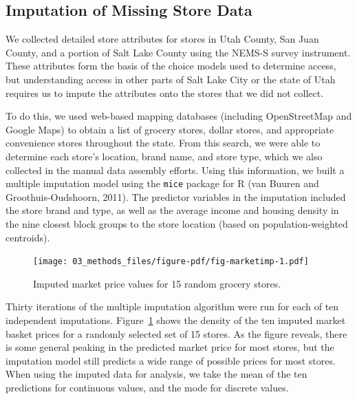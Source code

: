 \documentclass[
  letterpaper,
  DIV=11,
  numbers=noendperiod]{scrreport}
\begin{document}
\hypertarget{imputation-of-missing-store-data}{%
\subsection{Imputation of Missing Store
Data}\label{imputation-of-missing-store-data}}

We collected detailed store attributes for stores in Utah County, San
Juan County, and a portion of Salt Lake County using the NEMS-S survey
instrument. These attributes form the basis of the choice models used to
determine access, but understanding access in other parts of Salt Lake
City or the state of Utah requires us to impute the attributes onto the
stores that we did not collect.

To do this, we used web-based mapping databases (including OpenStreetMap
and Google Maps) to obtain a list of grocery stores, dollar stores, and
appropriate convenience stores throughout the state. From this search,
we were able to determine each store's location, brand name, and store
type, which we also collected in the manual data assembly efforts. Using
this information, we built a multiple imputation model using the
\texttt{mice} package for R (van Buuren and Groothuis-Oudshoorn, 2011).
The predictor variables in the imputation included the store brand and
type, as well as the average income and housing density in the nine
closest block groups to the store location (based on population-weighted
centroids).

\begin{figure}[t]

{\centering \texttt{[image: 03\_methods\_files/figure-pdf/fig-marketimp-1.pdf]}

}

\caption{\label{fig-marketimp}Imputed market price values for 15 random
grocery stores.}

\end{figure}

Thirty iterations of the multiple imputation algorithm were run for each
of ten independent imputations. Figure~\ref{fig-marketimp} shows the
density of the ten imputed market basket prices for a randomly selected
set of 15 stores. As the figure reveals, there is some general peaking
in the predicted market price for most stores, but the imputation model
still predicts a wide range of possible prices for most stores. When
using the imputed data for analysis, we take the mean of the ten
predictions for continuous values, and the mode for discrete values.
\end{document}
